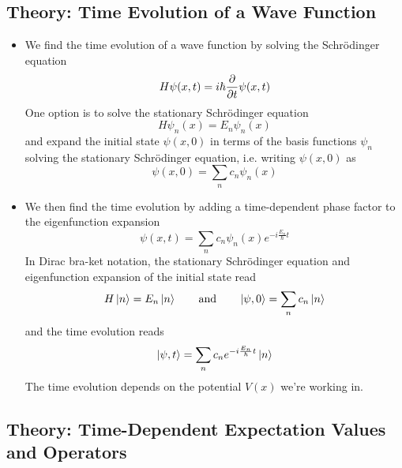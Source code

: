 \documentclass[11pt, a4paper]{article}
\newcommand{\eqtext}[1]{\qquad \text{#1} \qquad}
\newcommand{\Schro}{Schr\"{o}dinger\xspace}
\begin{document}
\subsection{Theory: Time Evolution of a Wave Function}
\begin{itemize}
	\item We find the time evolution of a wave function by solving the \Schro equation
	\begin{equation*}
		H\psi(x, t) = i\hbar \pdv{t}\psi(x, t)
	\end{equation*}
	One option is to solve the stationary \Schro equation
	\begin{equation*}
		H \psi_{n}(x) = E_{n}\psi_{n}(x)
	\end{equation*}
	and expand the initial state $ \psi(x, 0) $ in terms of the basis functions $ \psi_{n} $ solving the stationary \Schro equation, i.e. writing $ \psi(x, 0) $ as
	\begin{equation*}
		\psi(x, 0) = \sum_{n}c_{n}\psi_{n}(x)
	\end{equation*}
	\item We then find the time evolution by adding a time-dependent phase factor to the eigenfunction expansion
	\begin{equation*}
		\psi(x, t) = \sum_{n}c_{n}\psi_{n}(x)e^{-i\frac{E_{n}}{\hbar}t}
	\end{equation*}
	In Dirac bra-ket notation, the stationary \Schro equation and eigenfunction expansion of the initial state read
	\begin{equation*}
		H\ket{n} = E_{n}\ket{n} \eqtext{and} \ket{\psi, 0} = \sum_{n}c_{n}\ket{n} 
	\end{equation*}
	and the time evolution reads
	\begin{equation*}
		\ket{\psi, t} = \sum_{n}c_{n} e^{-i\frac{E_{n}}{\hbar}t} \ket{n}
	\end{equation*}
	The time evolution depends on the potential $ V(x) $ we're working in.
\end{itemize}

\subsection{Theory: Time-Dependent Expectation Values and Operators}
\end{document}
